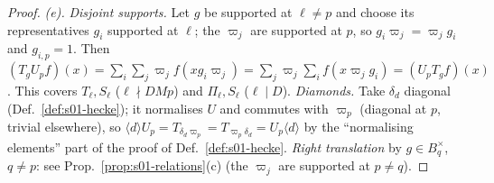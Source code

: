 \begin{proof}
\emph{(e).} \emph{Disjoint supports.} Let $g$ be supported at $\ell\ne p$ and choose its representatives $g_i$ supported at $\ell$;
the $\varpi_j$ are supported at $p$, so $g_i\varpi_j=\varpi_jg_i$ and $g_{i,p}=1$. Then
$(T_gU_pf)(x)=\sum_i\sum_j\varpi_jf(xg_i\varpi_j)=\sum_j\varpi_j\sum_if(x\varpi_jg_i)=(U_pT_gf)(x)$. This covers $T_\ell,S_\ell$ ($\ell\nmid DMp$) and
$\Pi_\ell,S_\ell$ ($\ell\mid D$). \emph{Diamonds.} Take $\delta_d$ diagonal (Def.~\ref{def:s01-hecke}); it normalises $U$ and commutes with
$\varpi_p$ (diagonal at $p$, trivial elsewhere), so $\langle d\rangle U_p=T_{\delta_d\varpi_p}=T_{\varpi_p\delta_d}=U_p\langle d\rangle$ by the
``normalising elements'' part of the proof of Def.~\ref{def:s01-hecke}. \emph{Right translation} by $g\in B_q^\times$, $q\ne p$: see
Prop.~\ref{prop:s01-relations}(c) (the $\varpi_j$ are supported at $p\ne q$).
\end{proof}

